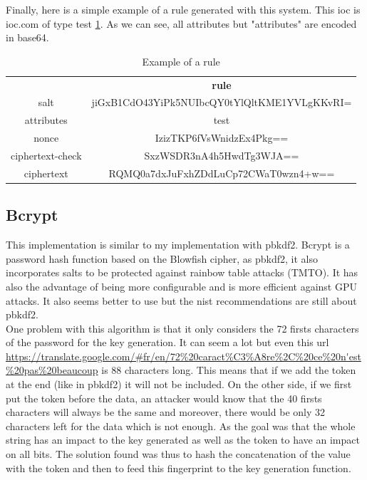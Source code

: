 \documentclass{eplmastersthesis}
\begin{document}
Finally, here is a simple example of a rule generated with this system. This \gls{ioc} is ioc.com of type test \ref{Example-rule-pbkdf2}. As we can see, all attributes but "attributes" are encoded in base64.
\begin{table}[]
\centering
\caption{Example of a rule}
\label{Example-rule-pbkdf2}
\begin{tabular}{cc}
{\textbf{}}  & {\textbf{rule}}                          \\
salt             & jiGxB1CdO43YiPk5NUIbcQY0tYlQltKME1YVLgKKvRI= \\
attributes       & test                                         \\
nonce            & IzizTKP6fVsWnidzEx4Pkg==                     \\
ciphertext-check & SxzWSDR3nA4h5HwdTg3WJA==                     \\
ciphertext       & RQMQ0a7dxJuFxhZDdLuCp72CWaT0wzn4+w==        
\end{tabular}
\end{table}

\subsection{Bcrypt}
\label{sec:BcryptExp}
This implementation is similar to my implementation with \gls{pbkdf2}. Bcrypt is a password hash function based on the Blowfish cipher, as \gls{pbkdf2}, it also incorporates salts to be protected against rainbow table attacks (TMTO).
It has also the advantage of being more configurable and is more efficient against GPU attacks. It also seems better to use but the \gls{nist} recommendations are still about \gls{pbkdf2}.\\

One problem with this algorithm is that it only considers the 72 firsts characters of the password for the key generation. It can seem a lot but even this \gls{url} \url{https://translate.google.com/#fr/en/72\%20caract\%C3\%A8re\%2C\%20ce\%20n'est\%20pas\%20beaucoup} is 88 characters long. This means that if we add the token at the end (like in \gls{pbkdf2}) it will not be included. On the other side, if we first put the token before the data, an attacker would know that the 40 firsts characters will always be the same and moreover, there would be only 32 characters left for the data which is not enough.
As the goal was that the whole string has an impact to the key generated as well as the token to have an impact on all bits. The solution found was thus  to hash the concatenation of the value with the token and then to feed this fingerprint to the key generation function.\\
\end{document}

